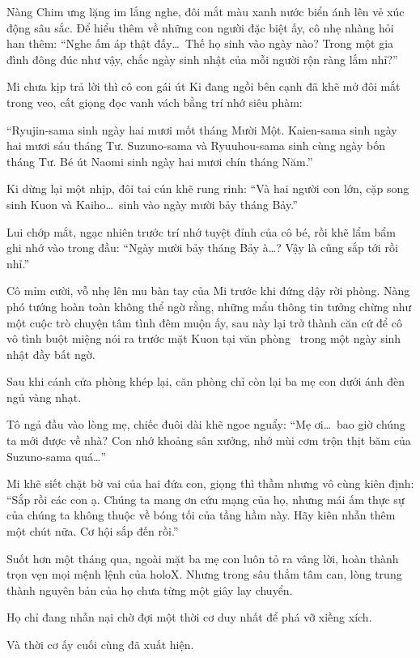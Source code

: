 \documentclass[../main.tex]{subfiles}
\begin{document}
Nàng Chim ưng lặng im lắng nghe, đôi mắt màu xanh nước biển ánh lên vẻ xúc động sâu sắc. Để hiểu thêm về những con người đặc biệt ấy, cô nhẹ nhàng hỏi han thêm: ``Nghe ấm áp thật đấy\dots\ Thế họ sinh vào ngày nào? Trong một gia đình đông đúc như vậy, chắc ngày sinh nhật của mỗi người rộn ràng lắm nhỉ?''

Mi chưa kịp trả lời thì cô con gái út Ki đang ngồi bên cạnh đã khẽ mở đôi mắt trong veo, cất giọng đọc vanh vách bằng trí nhớ siêu phàm:

``Ryujin-sama sinh ngày hai mươi mốt tháng Mười Một. Kaien-sama sinh ngày hai mươi sáu tháng Tư. Suzuno-sama và Ryuuhou-sama sinh cùng ngày bốn tháng Tư. Bé út Naomi sinh ngày hai mươi chín tháng Năm.''

Ki dừng lại một nhịp, đôi tai cún khẽ rung rinh: ``Và hai người con lớn, cặp song sinh Kuon và Kaiho\dots\ sinh vào ngày mười bảy tháng Bảy.''

Lui chớp mắt, ngạc nhiên trước trí nhớ tuyệt đỉnh của cô bé, rồi khẽ lẩm bẩm ghi nhớ vào trong đầu: ``Ngày mười bảy tháng Bảy à\dots? Vậy là cũng sắp tới rồi nhỉ.''

Cô mỉm cười, vỗ nhẹ lên mu bàn tay của Mi trước khi đứng dậy rời phòng. Nàng phó tướng hoàn toàn không thể ngờ rằng, những mẩu thông tin tưởng chừng như một cuộc trò chuyện tâm tình đêm muộn ấy, sau này lại trở thành căn cứ để cô vô tình buột miệng nói ra trước mặt Kuon tại văn phòng \hll\ trong một ngày sinh nhật đầy bất ngờ.

Sau khi cánh cửa phòng khép lại, căn phòng chỉ còn lại ba mẹ con dưới ánh đèn ngủ vàng nhạt.

Tô ngả đầu vào lòng mẹ, chiếc đuôi dài khẽ ngoe nguẩy: ``Mẹ ơi\dots\ bao giờ chúng ta mới được về nhà? Con nhớ khoảng sân xưởng, nhớ mùi cơm trộn thịt băm của Suzuno-sama quá\dots''

Mi khẽ siết chặt bờ vai của hai đứa con, giọng thì thầm nhưng vô cùng kiên định: ``Sắp rồi các con ạ. Chúng ta mang ơn cứu mạng của họ, nhưng mái ấm thực sự của chúng ta không thuộc về bóng tối của tầng hầm này. Hãy kiên nhẫn thêm một chút nữa. Cơ hội sắp đến rồi.''

Suốt hơn một tháng qua, ngoài mặt ba mẹ con luôn tỏ ra vâng lời, hoàn thành trọn vẹn mọi mệnh lệnh của holoX. Nhưng trong sâu thẳm tâm can, lòng trung thành nguyên bản của họ chưa từng một giây lay chuyển.

Họ chỉ đang nhẫn nại chờ đợi một thời cơ duy nhất để phá vỡ xiềng xích.

Và thời cơ ấy cuối cùng đã xuất hiện.
\end{document}

